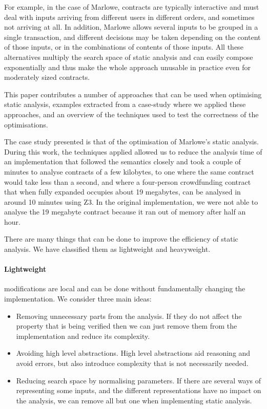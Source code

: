 \documentclass[english,runningheads]{llncs}
\begin{document}
For example, in the case of Marlowe, contracts are typically interactive
and must deal with inputs arriving from different users in different
orders, and sometimes not arriving at all. In addition, Marlowe allows
several inputs to be grouped in a single transaction, and different
decisions may be taken depending on the content of those inputs, or
in the combinations of contents of those inputs. All these alternatives
multiply the search space of static analysis and can easily compose
exponentially and thus make the whole approach unusable in practice
even for moderately sized contracts.

This paper contributes a number of approaches that can be used when
optimising static analysis, examples extracted from a case-study where
we applied these approaches, and an overview of the techniques used
to test the correctness of the optimisations. 

The case study presented is that of the optimisation of Marlowe's
static analysis. During this work, the techniques applied allowed
us to reduce the analysis time of an implementation that followed
the semantics closely and took a couple of minutes to analyse contracts
of a few kilobytes, to one where the same contract would take less
than a second, and where a four-person crowdfunding contract that
when fully expanded occupies about 19 megabytes, can be analysed in
around 10 minutes using Z3. In the original implementation, we were
not able to analyse the 19 megabyte contract because it ran out of
memory after half an hour.

There are many things that can be done to improve the efficiency of
static analysis. We have classified them as lightweight and heavyweight. 

\paragraph*{Lightweight}

modifications are local and can be done without fundamentally changing
the implementation. We consider three main ideas:
\begin{itemize}
\item Removing unnecessary parts from the analysis. If they do not affect
the property that is being verified then we can just remove them from
the implementation and reduce its complexity.
\item Avoiding high level abstractions. High level abstractions aid reasoning
and avoid errors, but also introduce complexity that is not necessarily
needed.
\item Reducing search space by normalising parameters. If there are several
ways of representing some inputs, and the different representations
have no impact on the analysis, we can remove all but one when
implementing static analysis.
\end{itemize}
\end{document}
